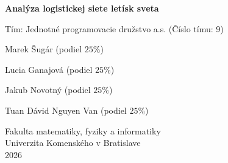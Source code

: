 \documentclass[11pt]{report}
\begin{document}
\begin{titlepage}
  \begin{center}
    \vspace*{1cm}

    \Huge
    \textbf{Analýza logistickej siete letísk sveta}

    \vspace{0.5cm}
    \LARGE
    Tím: Jednotné programovacie družstvo a.s. (Číslo tímu: 9)

    \vspace{0.5cm}
    \LARGE

    Marek Šugár (podiel $25 \%$)

    Lucia Ganajová (podiel $25 \%$)

    Jakub Novotný (podiel $25 \%$)

    Tuan Dávid Nguyen Van (podiel $25 \%$)

    \vfill

    \Large


    Fakulta matematiky, fyziky a informatiky\\
    Univerzita Komenského v Bratislave\\
    2026

  \end{center}
\end{titlepage}













\end{document}

